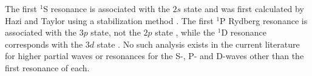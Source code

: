 \documentclass[Dissertation.tex]{subfiles}
\begin{document}
The first $^1$S resonance is associated with the $2s$ state \cite{DiRienzi2002b} 
and was first calculated by Hazi and Taylor using a stabilization method
\cite{Hazi1970}. The first $^1$P Rydberg resonance is associated with the $3p$ 
state, not the $2p$ state \cite{DiRienzi2002b}, while the $^1$D resonance 
corresponds with the $3d$ state \cite{DiRienzi2002a}. No such analysis exists
in the current literature for higher partial waves or resonances for the
S-, P- and D-waves other than the first resonance of each.


\biblio
\end{document}
